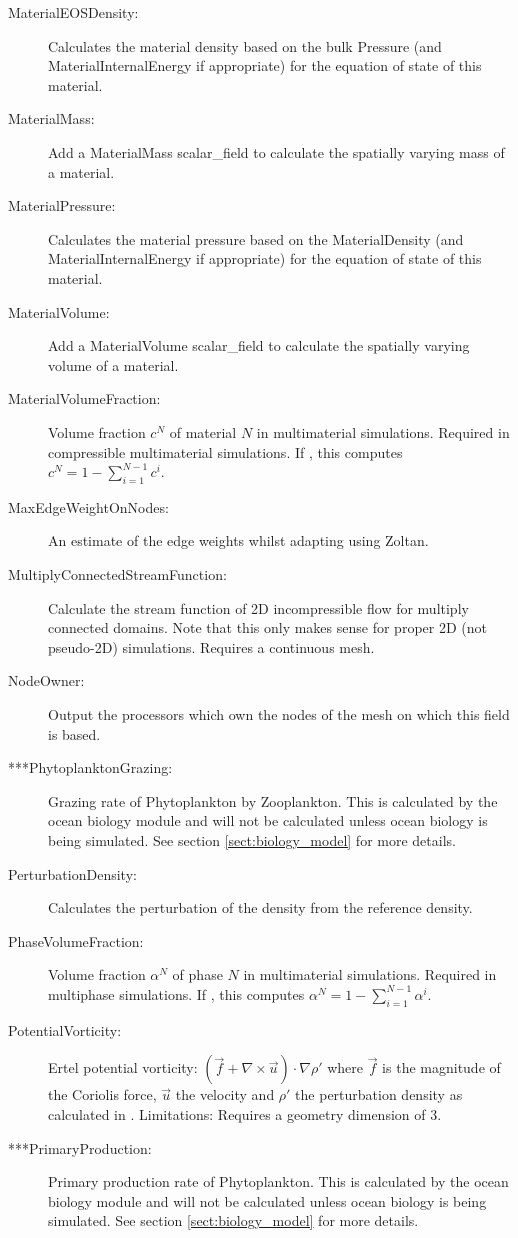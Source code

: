 \begin{description}
\item[MaterialEOSDensity:]Calculates the material density based on the bulk Pressure (and MaterialInternalEnergy if appropriate) for the equation of state of this material.
\item[MaterialMass:]Add a MaterialMass scalar\_field to calculate the spatially varying mass of a material. 
\item[MaterialPressure:] Calculates the material pressure based on the MaterialDensity (and MaterialInternalEnergy if appropriate) for the equation of state of this material.
\item[MaterialVolume:]Add a MaterialVolume scalar\_field to calculate the spatially varying volume of a material.
\item[MaterialVolumeFraction:]Volume fraction $c^N$ of material $N$ in multimaterial simulations. Required in compressible multimaterial simulations. If , this computes $c^N = 1 - \sum_{i=1}^{N-1}c^i$.
\item[MaxEdgeWeightOnNodes:]An estimate of the edge weights whilst adapting using Zoltan.
\item[MultiplyConnectedStreamFunction:]Calculate the stream function of 2D incompressible flow for multiply connected domains. Note that this only makes sense for proper 2D (not pseudo-2D) simulations. Requires a continuous mesh.
\item[NodeOwner:]Output the processors which own the nodes of the mesh on which this field is based.   
\item[***PhytoplanktonGrazing:]Grazing rate of Phytoplankton by Zooplankton. This is calculated by the ocean biology module and will not be calculated unless ocean biology is being simulated. See section \ref{sect:biology_model} for more details.
\item[PerturbationDensity:]Calculates the perturbation of the density from the reference density.
\item[PhaseVolumeFraction:]Volume fraction $\alpha^N$ of phase $N$ in multimaterial simulations. Required in multiphase simulations. If , this computes $\alpha^N = 1 - \sum_{i=1}^{N-1}\alpha^i$.
\item[PotentialVorticity:]Ertel potential vorticity: $(\vec{f} + \nabla \times \vec{u}) \cdot \nabla \rho'$ where $\vec{f}$ is the magnitude of the Coriolis force, $\vec{u}$ the velocity and $\rho '$ the perturbation density as calculated in .
	Limitations: Requires a geometry dimension of 3. 
\item[***PrimaryProduction:]Primary production rate of Phytoplankton. This is calculated by the ocean biology module and will not be calculated unless ocean biology is being simulated.  See section \ref{sect:biology_model} for more details.

\end{description}
